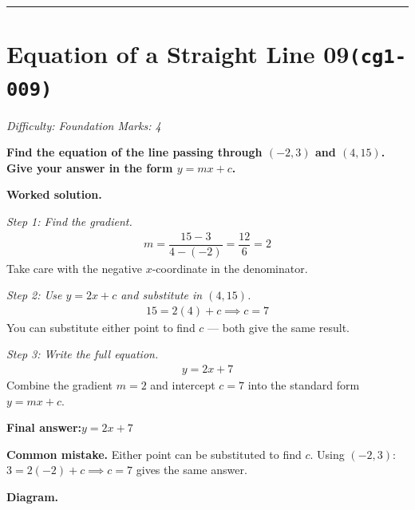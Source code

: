 \documentclass[11pt]{article}
\newcommand{\question}[1]{\par\medskip\noindent\textbf{#1}\par}
\begin{document}
\medskip\hrule

\section*{Equation of a Straight Line 09\quad\small\texttt{(cg1-009)}}
\textit{Difficulty: Foundation \quad\textbar\quad Marks: 4}

\question{Find the equation of the line passing through \( (-2, 3) \) and \( (4, 15) \). Give your answer in the form \( y = mx + c \).}

\textbf{Worked solution.}

\textit{Step 1: Find the gradient.}
\[\begin{gathered}
m = \dfrac{15 - 3}{4 - (-2)} = \dfrac{12}{6} = 2
\end{gathered}\]
Take care with the negative \( x \)-coordinate in the denominator.

\textit{Step 2: Use \( y = 2x + c \) and substitute in \( (4, 15) \).}
\[\begin{gathered}
15 = 2(4) + c \implies c = 7
\end{gathered}\]
You can substitute either point to find \( c \) --- both give the same result.

\textit{Step 3: Write the full equation.}
\[\begin{gathered}
y = 2x + 7
\end{gathered}\]
Combine the gradient \(m = 2\) and intercept \(c = 7\) into the standard form \(y = mx + c\).

\begin{answerbox}
\textbf{Final answer:}\quad \(\displaystyle y = 2x + 7\)
\end{answerbox}
\textbf{Common mistake.} Either point can be substituted to find \(c\). Using \((-2, 3)\): \(3 = 2(-2) + c \implies c = 7\) gives the same answer.

\textbf{Diagram.}
\end{document}
